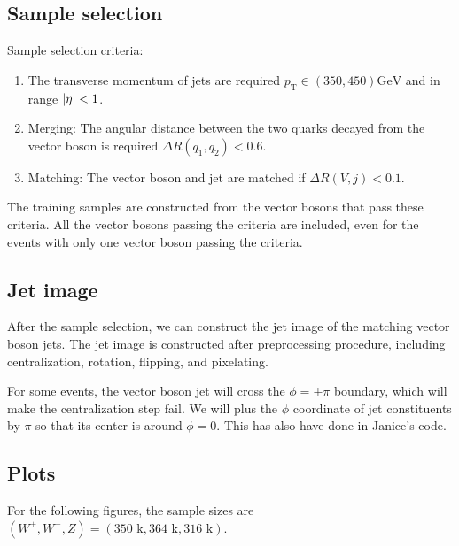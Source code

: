 \documentclass[12pt]{article}
\begin{document}
	
	\subsection{Sample selection}%
	\label{sub:sample_selection}
		Sample selection criteria:
		\begin{enumerate}
			\item The transverse momentum of jets are required $p_\text{T} \in (350, 450) \text{GeV}$ and in range $\abs{\eta}<1$.
			\item Merging: The angular distance between the two quarks decayed from the vector boson is required $\Delta R(q_1,q_2) < 0.6$.
			\item Matching: The vector boson and jet are matched if $\Delta R(V,j) < 0.1$. 
		\end{enumerate}

		The training samples are constructed from the vector bosons that pass these criteria. All the vector bosons passing the criteria are included, even for the events with only one vector boson passing the criteria.

	\subsection{Jet image}%
	\label{sub:jet_image}
		After the sample selection, we can construct the jet image of the matching vector boson jets. The jet image is constructed after preprocessing procedure, including centralization, rotation, flipping, and pixelating.

		For some events, the vector boson jet will cross the $\phi = \pm\pi$ boundary, which will make the centralization step fail. We will plus the $\phi$ coordinate of jet constituents by $\pi$ so that its center is around $\phi=0$. This has also have done in Janice's code.

	\subsection{Plots}%
	\label{sub:plots}
		For the following figures, the sample sizes are $(W^{+}, W^{-},Z) = (\text{350 k}, \text{364 k}, \text{316 k})$.
\end{document}
